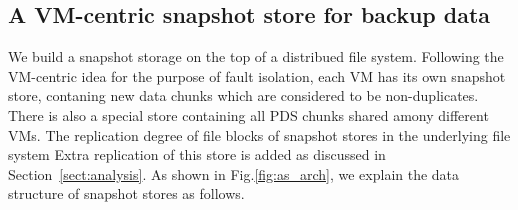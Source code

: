 


\subsection{A VM-centric snapshot store for backup data}

We build a snapshot storage on the top of a distribued file system.
Following the VM-centric idea for the purpose of fault isolation,
each VM has its own snapshot store, contaning new data chunks which are considered
to be non-duplicates.
There is also a special store containing all PDS chunks shared amony different VMs.
The replication degree of file blocks of snapshot stores in the underlying file system
Extra replication of this store is added as discussed in Section~\ref{sect:analysis}.
As shown in Fig.\ref{fig:as_arch}, we explain the data structure of snapshot stores as follows.

